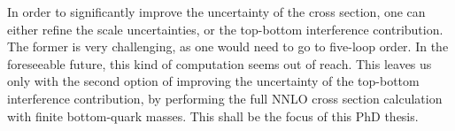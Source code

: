 In order to significantly improve the uncertainty of the cross section, one can either refine the scale uncertainties, or the top-bottom interference contribution. The former is very challenging, as one would need to go to five-loop order. In the foreseeable future, this kind of computation seems out of reach. This leaves us only with the second option of improving the uncertainty of the top-bottom interference contribution, by performing the full \acs{NNLO} cross section calculation with finite bottom-quark masses. This shall be the focus of this PhD thesis.